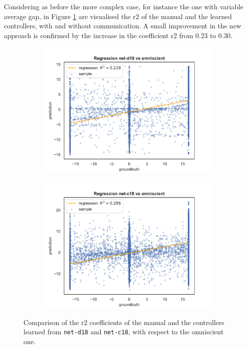 Considering as before the more complex case, for instance the one with variable 
average gap, in Figure \ref{fig:net-c18r2} are visualised the \gls{r2} of 
the manual and the learned controllers, with and without communication.
A small improvement in the new approach is confirmed by the increase in the 
coefficient \gls{r2} from $0.23$ to $0.30$. 
\begin{figure}[!htb]
	\begin{center}
		\begin{subfigure}[h]{0.49\textwidth}
			\includegraphics[width=\textwidth]{contents/images/net-d18/regression-net-d18-vs-omniscient}%
		\end{subfigure}
		\hfill\vspace{-0.5cm}
		\begin{subfigure}[h]{0.49\textwidth}
			\includegraphics[width=\textwidth]{contents/images/net-c18/regression-net-c18-vs-omniscient}%
		\end{subfigure}
	\end{center}
	\caption[Evaluation of the \gls{r2} coefficients of 
	\texttt{net-c18}.]{Comparison 
		of the \gls{r2} coefficients of the manual and the controllers learned from 
		\texttt{net-d18} and \texttt{net-c18}, with respect to the omniscient 
		one.}
	\label{fig:net-c18r2}
\end{figure}

